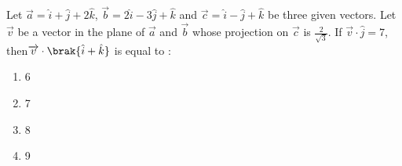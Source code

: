 \iffalse
\title{Assignment 3}
\author{AI24BTECH11018}
\section{mcq-single}
\fi

    \item Let $\overrightarrow{a}=\hat{i}+\hat{j}+2\hat{k}$, $\overrightarrow{b}=2\hat{i}-3\hat{j}+\hat{k}$ and $\overrightarrow{c}=\hat{i}-\hat{j}+\hat{k}$ be three given vectors. Let $\overrightarrow{v}$ be a vector in the plane of $\overrightarrow{a}$ and $\overrightarrow{b}$ whose projection on $\overrightarrow{c}$ is $\frac{2}{\sqrt{3}}$. If $\overrightarrow{v}\cdot\hat{j}=7$, then$\overrightarrow{v}\cdot\brak{\hat{i}+\hat{k}}$ is equal to :
    \hfill{}
    \begin{enumerate}
        \item 6
        \item 7
        \item 8
        \item 9
    \end{enumerate}
    
